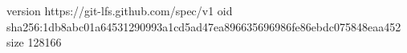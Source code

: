 version https://git-lfs.github.com/spec/v1
oid sha256:1db8abc01a64531290993a1cd5ad47ea896635696986fe86ebdc075848eaa452
size 128166
